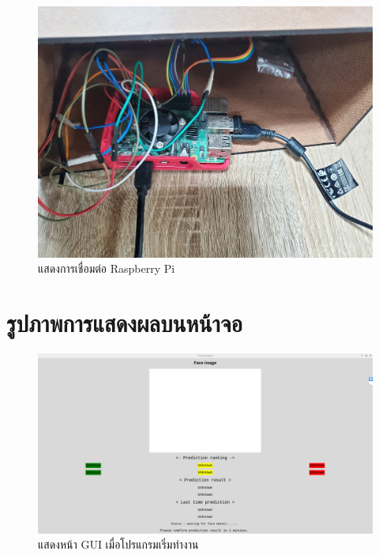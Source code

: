 \begin{figure}[!ht]
  \begin{center}
    \includegraphics[scale=.2]{pic/rpi.jpg}
    \caption[Raspberry Pi]{แสดงการเชื่อมต่อ Raspberry Pi}
    \label{fig:rpi_module}
  \end{center}
\end{figure}


\section{รูปภาพการแสดงผลบนหน้าจอ}

\begin{figure}[!ht]
    \begin{center}
      \includegraphics[scale=.4]{pic/main_page.png}
      \caption[main page]{แสดงหน้า GUI เมื่อโปรแกรมเริ่มทำงาน}
      \label{fig:main_page}
    \end{center}
  \end{figure}



